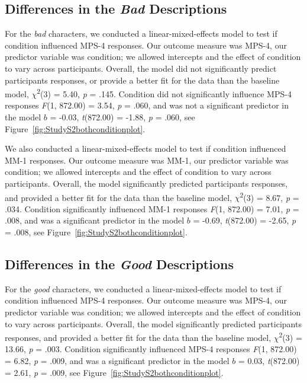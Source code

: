 \documentclass[
  man,floatsintext]{apa6}
\begin{document}
\subsection{\texorpdfstring{Differences in the \emph{Bad} Descriptions}{Differences in the Bad Descriptions}}\label{differences-in-the-bad-descriptions}

For the \emph{bad} characters, we conducted a linear-mixed-effects model to test if condition influenced MPS-4 responses. Our outcome measure was MPS-4, our predictor variable was condition; we allowed intercepts and the effect of condition to vary across participants. Overall, the model did not significantly predict participants responses, or provide a better fit for the data than the baseline model, \(\chi\)\textsuperscript{2}(3) = 5.40, \emph{p} = .145. Condition did not significantly influence MPS-4 responses \emph{F}(1, 872.00) = 3.54, \emph{p} = .060, and was not a significant predictor in the model \(b\) = -0.03, \emph{t}(872.00) = -1.88, \emph{p} = .060, see Figure~\ref{fig:StudyS2bothconditionplot}.

We also conducted a linear-mixed-effects model to test if condition influenced MM-1 responses. Our outcome measure was MM-1, our predictor variable was condition; we allowed intercepts and the effect of condition to vary across participants. Overall, the model significantly predicted participants responses, and provided a better fit for the data than the baseline model, \(\chi\)\textsuperscript{2}(3) = 8.67, \emph{p} = .034. Condition significantly influenced MM-1 responses \emph{F}(1, 872.00) = 7.01, \emph{p} = .008, and was a significant predictor in the model \(b\) = -0.69, \emph{t}(872.00) = -2.65, \emph{p} = .008, see Figure~\ref{fig:StudyS2bothconditionplot}.

\subsection{\texorpdfstring{Differences in the \emph{Good} Descriptions}{Differences in the Good Descriptions}}\label{differences-in-the-good-descriptions}

For the \emph{good} characters, we conducted a linear-mixed-effects model to test if condition influenced MPS-4 responses. Our outcome measure was MPS-4, our predictor variable was condition; we allowed intercepts and the effect of condition to vary across participants. Overall, the model significantly predicted participants responses, and provided a better fit for the data than the baseline model, \(\chi\)\textsuperscript{2}(3) = 13.66, \emph{p} = .003. Condition significantly influenced MPS-4 responses \emph{F}(1, 872.00) = 6.82, \emph{p} = .009, and was a significant predictor in the model \(b\) = 0.03, \emph{t}(872.00) = 2.61, \emph{p} = .009, see Figure~\ref{fig:StudyS2bothconditionplot}.
\end{document}
